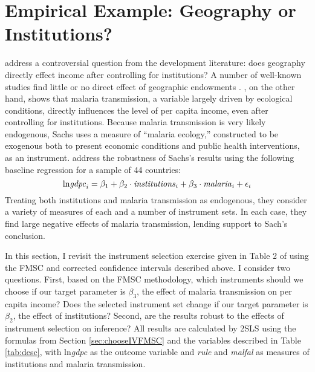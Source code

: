 \section{Empirical Example: Geography or Institutions?}
\label{sec:application}
\cite{Carstensen2006} address a controversial question from the development literature: does geography directly effect income after controlling for institutions? 
A number of well-known studies find little or no direct effect of geographic endowments \citep{Acemoglu,Rodrik,Easterly}. \cite{Sachs}, on the other hand, shows that malaria transmission, a variable largely driven by ecological conditions, directly influences the level of per capita income, even after controlling for institutions. Because malaria transmission is very likely endogenous, Sachs uses a measure of ``malaria ecology,'' constructed to be exogenous both to present economic conditions and public health interventions, as an instrument. 
\cite{Carstensen2006} address the robustness of Sachs's results using the following baseline regression for a sample of 44 countries:
\begin{equation}
	\mbox{ln\emph{gdpc}}_i = \beta_1 + \beta_2 \cdot \mbox{\emph{institutions}}_i + \beta_3 \cdot \mbox{\emph{malaria}}_i + \epsilon_i
\end{equation}
Treating both institutions and malaria transmission as endogenous, they consider a variety of measures of each and a number of instrument sets. 
In each case, they find large negative effects of malaria transmission, lending support to Sach's conclusion.

In this section, I revisit the instrument selection exercise given in Table 2 of \cite{Carstensen2006} using the FMSC and corrected confidence intervals described above. I consider two questions. 
First, based on the FMSC methodology, which instruments should we choose if our target parameter is $\beta_3$, the effect of malaria transmission on per capita income?
Does the selected instrument set change if our target parameter is $\beta_2$, the effect of institutions?
Second, are the results robust to the effects of instrument selection on inference?
All results are calculated by 2SLS using the formulas from Section \ref{sec:chooseIVFMSC} and the variables described in Table \ref{tab:desc}, with ln\emph{gdpc} as the outcome  variable and \emph{rule} and \emph{malfal} as measures of institutions and malaria transmission.


